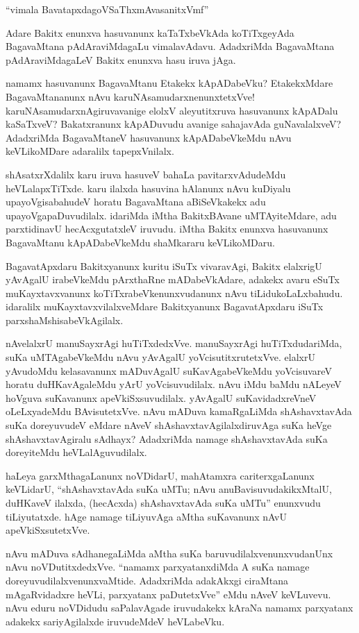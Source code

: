 \begin{shloka}
``vimala BavatapxdagoVSaThxmAvasanitxVmf''
\end{shloka}

Adare Bakitx enunxva hasuvanunx kaTaTxbeVkAda koTiTxgeyAda BagavaMtana pAdAraviMdagaLu vimalavAdavu. AdadxriMda BagavaMtana pAdAraviMdagaLeV Bakitx enunxva hasu iruva jAga.

namamx hasuvanunx BagavaMtanu Etakekx kApADabeVku? EtakekxMdare BagavaMtananunx nAvu karuNAsamudarxnenunxtetxVve! karuNAsamudarxnAgiruvavanige elolxV aleyutitxruva hasuvanunx kApADalu kaSaTxveV? Bakatxranunx kApADuvudu avanige sahajavAda guNavalalxveV? AdadxriMda BagavaMtaneV hasuvanunx kApADabeVkeMdu nAvu keVLikoMDare adaralilx tapepxVnilalx.

shAsatxrXdalilx karu iruva hasuveV bahaLa pavitarxvAdudeMdu heVLalapxTiTxde. karu ilalxda hasuvina hAlanunx nAvu kuDiyalu upayoVgisabahudeV horatu BagavaMtana aBiSeVkakekx adu upayoVgapaDuvudilalx. idariMda iMtha BakitxBAvane uMTAyiteMdare, adu parxtidinavU hecAcxgutatxleV iruvudu. iMtha Bakitx enunxva hasuvanunx BagavaMtanu kApADabeVkeMdu shaMkararu keVLikoMDaru.

BagavatApxdaru Bakitxyanunx kuritu iSuTx vivaravAgi, Bakitx elalxrigU yAvAgalU irabeVkeMdu pArxthaRne mADabeVkAdare, adakekx avaru eSuTx muKayxtavxvanunx koTiTxrabeVkenunxvudanunx nAvu tiLidukoLaLxbahudu. idaralilx muKayxtavxvilalxveMdare Bakitxyanunx BagavatApxdaru iSuTx parxshaMshisabeVkAgilalx.

nAvelalxrU manuSayxrAgi huTiTxdedxVve. manuSayxrAgi huTiTxdudariMda, suKa uMTAgabeVkeMdu nAvu yAvAgalU yoVcisutitxrutetxVve. elalxrU yAvudoMdu kelasavanunx mADuvAgalU suKavAgabeVkeMdu yoVcisuvareV horatu duHKavAgaleMdu yArU yoVcisuvudilalx. nAvu iMdu baMdu nALeyeV hoVguva suKavanunx apeVkiSxsuvudilalx. yAvAgalU suKavidadxreVneV oLeLxyadeMdu BAvisutetxVve. nAvu mADuva kamaRgaLiMda shAshavxtavAda suKa doreyuvudeV eMdare nAveV shAshavxtavAgilalxdiruvAga suKa heVge shAshavxtavAgiralu sAdhayx? AdadxriMda namage shAshavxtavAda suKa doreyiteMdu heVLalAguvudilalx.

haLeya garxMthagaLanunx noVDidarU, mahAtamxra cariterxgaLanunx keVLidarU, ``shAshavxtavAda suKa uMTu; nAvu anuBavisuvudakikxMtalU, duHKaveV ilalxda, (hecAcxda) shAshavxtavAda suKa uMTu'' enunxvudu tiLiyutatxde. hAge namage tiLiyuvAga aMtha suKavanunx nAvU apeVkiSxsutetxVve.

nAvu mADuva sAdhanegaLiMda aMtha suKa baruvudilalxvenunxvudanUnx nAvu noVDutitxdedxVve. ``namamx parxyatanxdiMda A suKa namage doreyuvudilalxvenunxvaMtide. AdadxriMda adakAkxgi ciraMtana mAgaRvidadxre heVLi, parxyatanx paDutetxVve'' eMdu nAveV keVLuvevu. nAvu eduru noVDidudu saPalavAgade iruvudakekx kAraNa namamx parxyatanx adakekx sariyAgilalxde iruvudeMdeV heVLabeVku.

